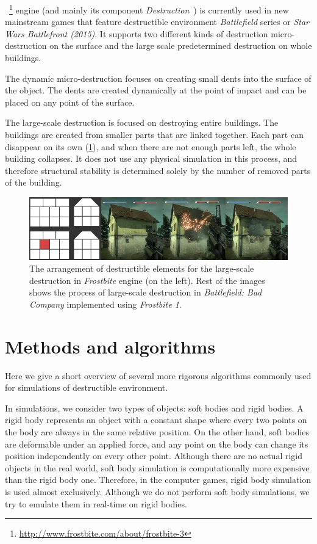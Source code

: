 ~\footnote{\url{http://www.frostbite.com/about/frostbite-3}} engine (and mainly its component \emph{Destruction}~\cite{destruction}) is currently used in new mainstream games that feature destructible environment \eg \emph{Battlefield} series or \emph{Star Wars Battlefront (2015)}. It supports two different kinds of destruction micro-destruction on the surface and the large scale predetermined destruction on whole buildings. 

The dynamic micro-destruction focuses on creating small dents into the surface of the object. The dents are created dynamically at the point of impact and can be placed on any point of the surface.

The large-scale destruction is focused on destroying entire buildings. The buildings are created from smaller parts that are linked together. Each part can disappear on its own (\cref{fig:frostbite}), and when there are not enough parts left, the whole building collapses. It does not use any physical simulation in this process, and therefore structural stability is determined solely by the number of removed parts of the building.

\begin{figure}
\centering
\includegraphics[width=\textwidth]{img/frostbite}
\caption{The arrangement of destructible elements for the large-scale destruction in \emph{Frostbite} engine (on the left). Rest of the images shows the process of large-scale destruction in \emph{Battlefield: Bad Company} implemented using \emph{Frostbite 1}.}
\label{fig:frostbite}
\end{figure}

\section{Methods and algorithms}

Here we give a short overview of several more rigorous algorithms commonly used for simulations of destructible environment. 

In simulations, we consider two types of objects: soft bodies and rigid bodies. A rigid body represents an object with a constant shape where every two points on the body are always in the same relative position. On the other hand, soft bodies are deformable under an applied force, and any point on the body can change its position independently on every other point. Although there are no actual rigid objects in the real world, soft body simulation is computationally more expensive than the rigid body one. Therefore, in the computer games, rigid body simulation is used almost exclusively. Although we do not perform soft body simulations, we try to emulate them in real-time on rigid bodies.

